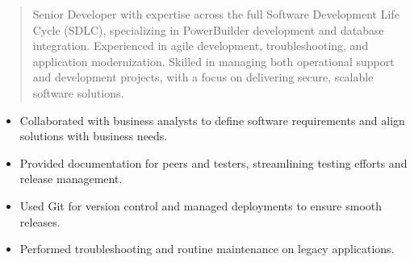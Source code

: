 



\makecvheader

\begin{quote}
  \noindent
  Senior Developer with expertise across the full Software Development Life Cycle (SDLC), specializing in PowerBuilder development and database integration. Experienced in agile development, troubleshooting, and application modernization. Skilled in managing both operational support and development projects, with a focus on delivering secure, scalable software solutions.
\end{quote}

\par\smallskip
\noindent
\begin{minipage}{20cm}
  \begin{minipage}{9.75cm}
    \begin{itemize}
      \item Collaborated with business analysts to define software requirements and align solutions with business needs.
      \item Provided documentation for peers and testers, streamlining testing efforts and release management.
    \end{itemize}
  \end{minipage}
  \hfill
  \begin{minipage}{9.75cm}
    \begin{itemize}
      \item Used Git for version control and managed deployments to ensure smooth releases.
      \item Performed troubleshooting and routine maintenance on legacy applications.
    \end{itemize}
  \end{minipage}
\end{minipage}
\par\smallskip
\divider

